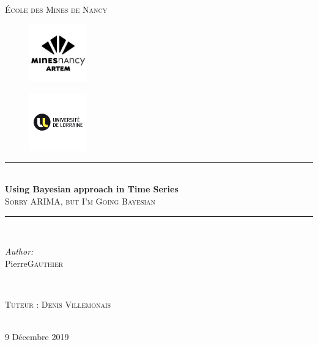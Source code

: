 \documentclass{article}
\title{\thesistitle}
\author{\thesisauthorfirst\space\thesisauthorsecond}
\date{\thesisdate}
\def\thesistitle{Using Bayesian approach in Time Series}
\def\thesissubtitle{Sorry ARIMA, but I’m Going Bayesian}
\def\thesisauthorfirst{Pierre}
\def\thesisauthorsecond{Gauthier}
\def\thesisdate{9 Décembre 2019}
\theoremstyle{definition}
\theoremstyle{remark}
\begin{document}
\begin{titlepage}	
	\thispagestyle{empty}
	\newcommand{\HRule}{\rule{\linewidth}{0.5mm}}
	\center
	\textsc{\Large École des Mines de Nancy}\\[.7cm]

	
	\begin{figure}[h]
		\centering
		\begin{minipage}{.5\textwidth}
			\centering
			\includegraphics[width=25mm]{logos/logo.png}\\[.5cm]
		\end{minipage}%
		\begin{minipage}{0.5\textwidth}
			\centering
			\includegraphics[width=25mm]{logos/univ.png}\\[.5cm]
		\end{minipage}
	\end{figure}


	
	\HRule \\[0.5cm]
	{ \huge \bfseries \thesistitle}\\[0.1cm]
	\textsc{\thesissubtitle}\\
	
	\HRule \\[3cm]
	\begin{minipage}{0.4\textwidth}
		\begin{flushleft} \large
			\emph{Author:}\\
			\thesisauthorfirst\space \textsc{\thesisauthorsecond}
		\end{flushleft}
	\end{minipage}
	~
	\begin{minipage}{0.4\textwidth}
		\begin{flushright} \large
			\textsc{\large Tuteur : Denis Villemonais}\\[.5cm]
	\end{flushright}
\end{minipage}\\[4cm]

{\large \thesisdate}\\
\clearpage
\end{titlepage}
\end{document}
